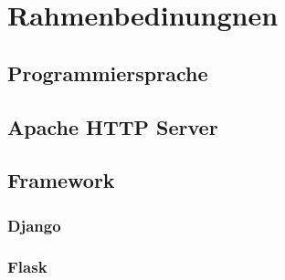 
\chapter{Rahmenbedinungnen}

\section{Programmiersprache}

\section{Apache HTTP Server}

\section{Framework}

\subsection{Django}

\subsection{Flask}